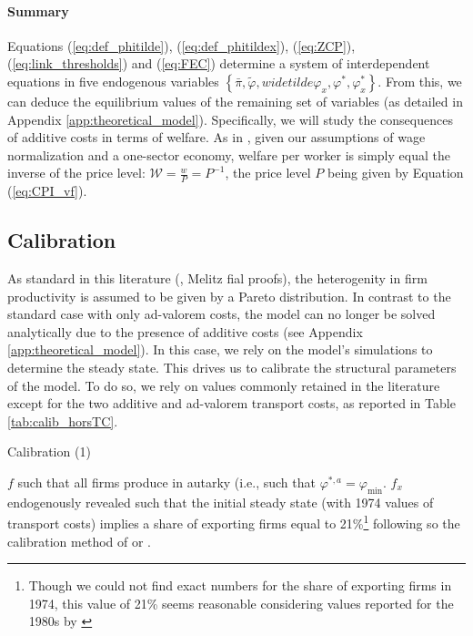 \documentclass[a4paper,11pt]{article}
\begin{document}
\paragraph{Summary} Equations (\ref{eq:def_phitilde}), (\ref{eq:def_phitildex}), (\ref{eq:ZCP}), (\ref{eq:link_thresholds}) and (\ref{eq:FEC}) determine a system of interdependent equations in five endogenous variables $\left\{\bar{\pi}, \widetilde{\varphi}, widetilde{\varphi}_x, \varphi^\ast, \varphi^\ast_x \right\}$. From this, we can deduce the equilibrium values of the remaining set of variables (as detailed in Appendix \ref{app:theoretical_model}). Specifically, we will study the consequences of additive costs in terms of welfare. As in \cite{melitz}, given our assumptions of wage normalization and a one-sector economy, welfare per worker is simply equal the inverse of the price level: $\mathcal{W} = \frac{w}{P}= P^{-1}$, the price level $P$ being given by Equation (\ref{eq:CPI_vf}).


\subsection{Calibration}

As standard in this literature (\cite{Irrazabal_2015}, Melitz fial proofs), the heterogenity in firm productivity is assumed to be given by a Pareto distribution. In contrast to the standard case with only ad-valorem costs, the model can no longer be solved analytically due to the presence of additive costs (see Appendix \ref{app:theoretical_model}). In this case, we rely on the model's simulations to determine the steady state. This drives us to calibrate the structural parameters of the model. To do so, we rely on values commonly retained in the literature except for the two additive and ad-valorem transport costs, as reported in Table \ref{tab:calib_horsTC}.
\begin{table}[htbp]
  \centering
  \caption{Calibration (1)} \label{tab:calib_horsTC}
\begin{center}
	
\end{center}
\end{table}

$f$ such that all firms produce in autarky (i.e., such that $\varphi^{\ast,a} = \varphi_{\text{min}}$. $f_x$ endogenously revealed such that the initial steady state (with 1974 values of transport costs) implies a share of exporting firms equal to 21\%\footnote{Though we could not find exact numbers for the share of exporting firms in 1974, this value of 21\% seems reasonable considering values reported for the 1980s by \citet{Lincoln_McCallum2018}} following so the calibration method of \cite{ghironi} or \cite{Irrazabal_2015}.
\end{document}
